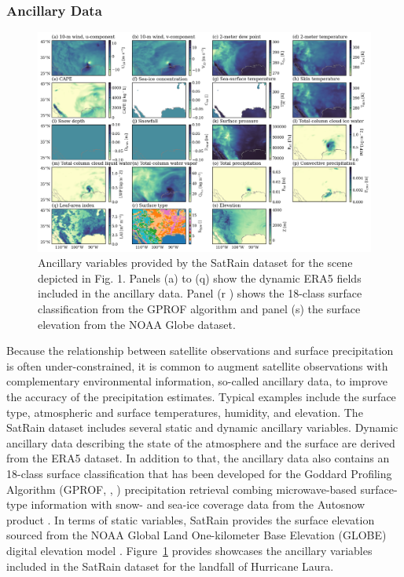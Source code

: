 \documentclass[11pt]{article}
\begin{document}
\subsubsection{Ancillary Data}

\begin{figure}[htbp] %
	\centering
	\includegraphics[width=1.0\textwidth]{figures/fig04}
	\caption{
		Ancillary variables provided by the SatRain dataset for the scene
		depicted in Fig. 1. Panels (a) to (q) show the dynamic ERA5 fields included in
		the ancillary data. Panel (r ) shows the 18-class surface classification from
		the GPROF algorithm and panel (s) the surface elevation from the NOAA Globe
		dataset.
	}
	\label{fig:ancillary_data}
\end{figure}

Because the relationship between satellite observations and surface
precipitation is often under-constrained, it is common to augment satellite
observations with complementary environmental information, so-called ancillary
data, to improve the accuracy of the precipitation estimates. Typical examples
include the surface type, atmospheric and surface temperatures, humidity, and
elevation. The SatRain dataset includes several static and dynamic ancillary
variables. Dynamic ancillary data describing the state of the atmosphere and the
surface are derived from the ERA5 \citep{Hersbach2020ERA5} dataset. In addition
to that, the ancillary data also contains an 18-class surface classification
that has been developed for the Goddard Profiling Algorithm (GPROF,
\citeauthor{GPM_GPROF_ATBD_V7}, \citeyear{GPM_GPROF_ATBD_V7}) precipitation
retrieval combing microwave-based surface-type information with snow- and
sea-ice coverage data from the Autosnow product \citep{NCEI2025SNOWMaps}. In
terms of static variables, SatRain provides the surface elevation sourced from
the NOAA Global Land One-kilometer Base Elevation (GLOBE) digital elevation
model \citep{Hastings1999GLOBE}. Figure~\ref{fig:ancillary_data} provides
showcases the ancillary variables included in the SatRain dataset for the
landfall of Hurricane Laura.
\end{document}
